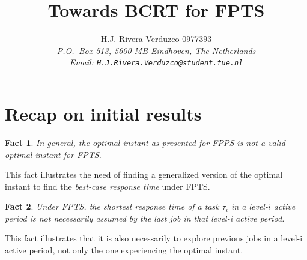 \documentclass[fleqn]{article}
\title{\sf Towards BCRT for FPTS}
\author{{\sf H.J. Rivera Verduzco 0977393}\\
{\footnotesize\sl P.O.~Box 513, 5600 MB Eindhoven, The Netherlands}\\
{\footnotesize \sl Email: \tt H.J.Rivera.Verduzco@student.tue.nl}}
\newtheorem{fact}{Fact}
\begin{document}
\maketitle


\section*{Recap on initial results}

\begin{fact}
	In general, the optimal instant as presented for FPPS is not a valid optimal instant for FPTS.
\end{fact}

This fact illustrates the need of finding a generalized version of the optimal instant to find the \textit{best-case response time} under FPTS.

\begin{fact}
	Under FPTS, the shortest response time of a task $\tau_i$ in a level-$i$ active period is not necessarily assumed by the last job in that level-i active period.
\end{fact}

This fact illustrates that it is also necessarily to explore previous jobs in a level-i active period, not only the one experiencing the optimal instant.
\end{document}
